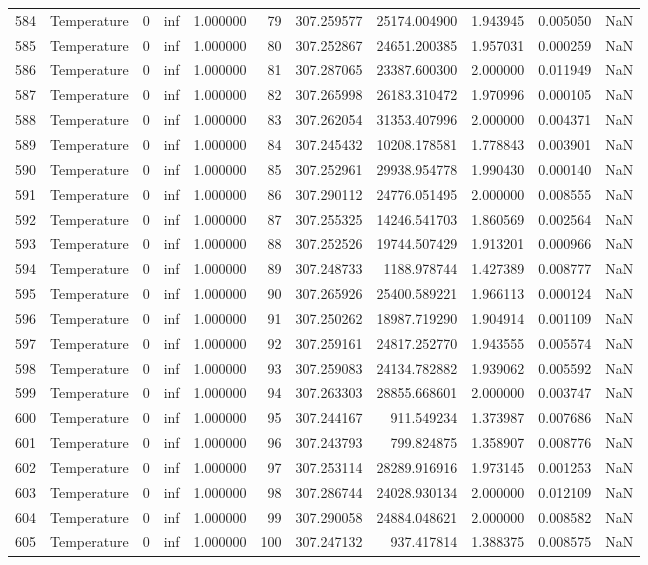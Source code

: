 \begin{tabular}{llrrrrrrrrr}
584 & Temperature & 0 & inf & 1.000000 & 79 & 307.259577 & 25174.004900 & 1.943945 & 0.005050 & NaN \\
585 & Temperature & 0 & inf & 1.000000 & 80 & 307.252867 & 24651.200385 & 1.957031 & 0.000259 & NaN \\
586 & Temperature & 0 & inf & 1.000000 & 81 & 307.287065 & 23387.600300 & 2.000000 & 0.011949 & NaN \\
587 & Temperature & 0 & inf & 1.000000 & 82 & 307.265998 & 26183.310472 & 1.970996 & 0.000105 & NaN \\
588 & Temperature & 0 & inf & 1.000000 & 83 & 307.262054 & 31353.407996 & 2.000000 & 0.004371 & NaN \\
589 & Temperature & 0 & inf & 1.000000 & 84 & 307.245432 & 10208.178581 & 1.778843 & 0.003901 & NaN \\
590 & Temperature & 0 & inf & 1.000000 & 85 & 307.252961 & 29938.954778 & 1.990430 & 0.000140 & NaN \\
591 & Temperature & 0 & inf & 1.000000 & 86 & 307.290112 & 24776.051495 & 2.000000 & 0.008555 & NaN \\
592 & Temperature & 0 & inf & 1.000000 & 87 & 307.255325 & 14246.541703 & 1.860569 & 0.002564 & NaN \\
593 & Temperature & 0 & inf & 1.000000 & 88 & 307.252526 & 19744.507429 & 1.913201 & 0.000966 & NaN \\
594 & Temperature & 0 & inf & 1.000000 & 89 & 307.248733 & 1188.978744 & 1.427389 & 0.008777 & NaN \\
595 & Temperature & 0 & inf & 1.000000 & 90 & 307.265926 & 25400.589221 & 1.966113 & 0.000124 & NaN \\
596 & Temperature & 0 & inf & 1.000000 & 91 & 307.250262 & 18987.719290 & 1.904914 & 0.001109 & NaN \\
597 & Temperature & 0 & inf & 1.000000 & 92 & 307.259161 & 24817.252770 & 1.943555 & 0.005574 & NaN \\
598 & Temperature & 0 & inf & 1.000000 & 93 & 307.259083 & 24134.782882 & 1.939062 & 0.005592 & NaN \\
599 & Temperature & 0 & inf & 1.000000 & 94 & 307.263303 & 28855.668601 & 2.000000 & 0.003747 & NaN \\
600 & Temperature & 0 & inf & 1.000000 & 95 & 307.244167 & 911.549234 & 1.373987 & 0.007686 & NaN \\
601 & Temperature & 0 & inf & 1.000000 & 96 & 307.243793 & 799.824875 & 1.358907 & 0.008776 & NaN \\
602 & Temperature & 0 & inf & 1.000000 & 97 & 307.253114 & 28289.916916 & 1.973145 & 0.001253 & NaN \\
603 & Temperature & 0 & inf & 1.000000 & 98 & 307.286744 & 24028.930134 & 2.000000 & 0.012109 & NaN \\
604 & Temperature & 0 & inf & 1.000000 & 99 & 307.290058 & 24884.048621 & 2.000000 & 0.008582 & NaN \\
605 & Temperature & 0 & inf & 1.000000 & 100 & 307.247132 & 937.417814 & 1.388375 & 0.008575 & NaN \\
\bottomrule
\end{tabular}
